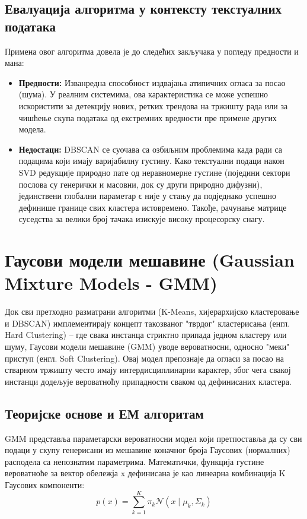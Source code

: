\documentclass[a4paper,12pt]{report}
\begin{document}
	\subsection{Евалуација алгоритма у контексту текстуалних података}
	Примена овог алгоритма довела је до следећих закључака у погледу предности и мана:
	\begin{itemize}
		\item \textbf{Предности:} Изванредна способност издвајања атипичних огласа за посао (шума). У реалним системима, ова карактеристика се може успешно искористити за детекцију нових, ретких трендова на тржишту рада или за чишћење скупа података од екстремних вредности пре примене других модела.
	
		\item \textbf{Недостаци:} DBSCAN се суочава са озбиљним проблемима када ради са подацима који имају варијабилну густину. Како текстуални подаци након SVD редукције природно пате од неравномерне густине (поједини сектори послова су генерички и масовни, док су други природно дифузни), јединствени глобални параметар ϵ није у стању да подједнако успешно дефинише границе свих кластера истовремено. Такође, рачунање матрице суседства за велики број тачака изискује високу процесорску снагу.
	\end{itemize}

	\section{Гаусови модели мешавине (Gaussian Mixture Models - GMM)}
	Док сви претходно разматрани алгоритми (K-Means, хијерархијско кластеровање и DBSCAN) имплементирају концепт такозваног "тврдог" кластерисања (енгл. Hard Clustering) – где свака инстанца стриктно припада једном кластеру или шуму, Гаусови модели мешавине (GMM) уводе вероватносни, односно "меки" приступ (енгл. Soft Clustering). Овај модел препознаје да огласи за посао на стварном тржишту често имају интердисциплинарни карактер, због чега свакој инстанци додељује вероватноћу припадности сваком од дефинисаних кластера.

	\subsection{Теоријске основе и ЕМ алгоритам}
	GMM представља параметарски вероватносни модел који претпоставља да су сви подаци у скупу генерисани из мешавине коначног броја Гаусових (нормалних) расподела са непознатим параметрима. Математички, функција густине вероватноће за вектор обележја x дефинисана је као линеарна комбинација K Гаусових компоненти:
	$$ p(x) = \sum_{k=1}^{K} \pi_k \mathcal{N}(x \mid \mu_k, \Sigma_k) $$
	
\end{document}
